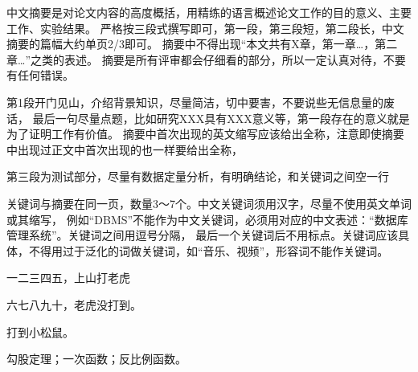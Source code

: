 \abstractch

中文摘要是对论文内容的高度概括，用精练的语言概述论文工作的目的意义、主要工作、实验结果。
严格按三段式撰写即可，第一段，第三段短，第二段长，中文摘要的篇幅大约单页2/3即可。
摘要中不得出现“本文共有X章，第一章…，第二章…”之类的表述。 
摘要是所有评审都会仔细看的部分，所以一定认真对待，不要有任何错误。

第1段开门见山，介绍背景知识，尽量简洁，切中要害，不要说些无信息量的废话，
最后一句尽量点题，比如研究XXX具有XXX意义等，第一段存在的意义就是为了证明工作有价值。
摘要中首次出现的英文缩写应该给出全称，注意即使摘要中出现过正文中首次出现的也一样要给出全称，

第三段为测试部分，尽量有数据定量分析，有明确结论，和关键词之间空一行

关键词与摘要在同一页，数量3～7个。中文关键词须用汉字，尽量不使用英文单词或其缩写，
例如“DBMS”不能作为中文关键词，必须用对应的中文表述：“数据库管理系统”。关键词之间用逗号分隔，
最后一个关键词后不用标点。关键词应该具体，不得用过于泛化的词做关键词，如“音乐、视频”，形容词不能作关键词。

一二三四五，上山打老虎\cite{张立先2011数控机床高速微线段插补算法与自适应前瞻处理}

六七八九十，老虎没打到\cite{liu2023llava}。

打到小松鼠\cite{fedus2022switch}。

\vspace{5pt}

\keywordsch 勾股定理；一次函数；反比例函数。
